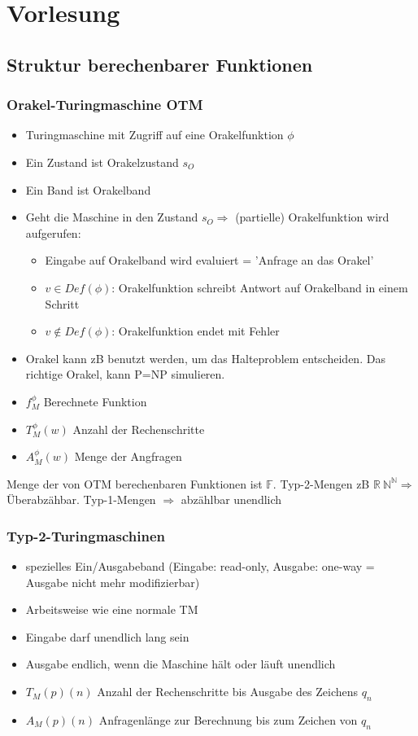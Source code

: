 \documentclass[ngerman]{scrartcl}
\begin{document}
\section{Vorlesung}
\subsection{Struktur berechenbarer Funktionen}
\subsubsection{Orakel-Turingmaschine OTM}
\begin{itemize}
  \item Turingmaschine mit Zugriff auf eine Orakelfunktion $ \phi $
  \item Ein Zustand ist Orakelzustand $ s_O $
  \item Ein Band ist Orakelband
  \item Geht die Maschine in den Zustand $ s_O \Rightarrow$ (partielle) Orakelfunktion wird aufgerufen:
  \begin{itemize}
    \item Eingabe auf Orakelband wird evaluiert = 'Anfrage an das Orakel'
    \item $ v \in Def(\phi) $: Orakelfunktion schreibt Antwort auf Orakelband in einem Schritt
    \item $ v \not\in Def(\phi) $: Orakelfunktion endet mit Fehler
  \end{itemize}
  \item Orakel kann zB benutzt werden, um das Halteproblem entscheiden. Das richtige Orakel, kann P=NP simulieren.
  \item $ f^\phi _M $ Berechnete Funktion
  \item $ T^\phi _M(w) $ Anzahl der Rechenschritte
  \item $ A^\phi _M(w) $ Menge der Angfragen
\end{itemize}
Menge der von OTM berechenbaren Funktionen ist $ \mathbb{F} $. Typ-2-Mengen zB $ \mathbb{R}\ \mathbb{N}^\mathbb{N} \Rightarrow$ Überabzähbar. Typ-1-Mengen $ \Rightarrow $ abzählbar unendlich

\subsubsection{Typ-2-Turingmaschinen}
\begin{itemize}
  \item spezielles Ein/Ausgabeband (Eingabe: read-only, Ausgabe: one-way = Ausgabe nicht mehr modifizierbar)
  \item Arbeitsweise wie eine normale TM
  \item Eingabe darf unendlich lang sein
  \item Ausgabe endlich, wenn die Maschine hält oder läuft unendlich
  \item $ T_M(p)(n) $ Anzahl der Rechenschritte bis Ausgabe des Zeichens $ q_n $
  \item $ A_M(p)(n) $ Anfragenlänge zur Berechnung bis zum Zeichen von $ q_n $
\end{itemize}
\end{document}
